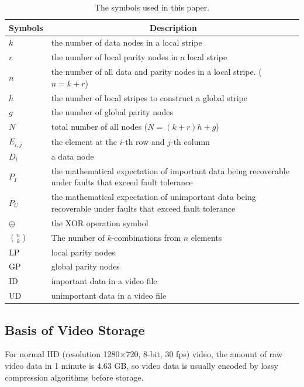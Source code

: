 \documentclass[sigconf]{acmart}
\begin{document}
\begin{table}[]\footnotesize
\caption{The symbols used in this paper.}\label{parameter}
\centering
\begin{tabular}{|p{0.7cm}<{\centering}|p{6.5cm}|}
\hline
Symbols & \multicolumn{1}{c|}{Description} \\ \hline \hline
$k$ & the number of data nodes in a local stripe \\ \hline
$r$ & the number of local parity nodes in a local stripe \\ \hline
$n$ & the number of all data and parity nodes in a local stripe. ($n=k+r$) \\ \hline
$h$ & the number of local stripes to construct a global stripe \\ \hline
$g$ & the number of global parity nodes \\ \hline
$N$ & total number of all nodes ($N=(k+r)h+g$) \\ \hline
$E_{i,j}$ & the element at the $i$-th row and $j$-th column \\ \hline
$D_i$ & a data node \\ \hline
$P_{I}$ & the mathematical expectation of important data being recoverable under faults that exceed fault tolerance \\ \hline
$P_{U}$ & the mathematical expectation of unimportant data being recoverable under faults that exceed fault tolerance \\ \hline
$\oplus$ & the XOR operation symbol \\ \hline
$\binom{n}{k}$ & The number of $k$-combinations from $n$ elements\\ \hline
LP & local parity nodes \\ \hline
GP & global parity nodes \\ \hline
ID & important data in a video file \\ \hline
UD & unimportant data in a video file \\ \hline
\end{tabular}
\end{table}


\subsection{Basis of Video Storage}\label{video storage}
For normal HD (resolution 1280$\times$720, 8-bit, 30 fps) video, the amount of raw video data in 1 minute is 4.63 GB, so video data is usually encoded by lossy compression algorithms before storage.
\end{document}
